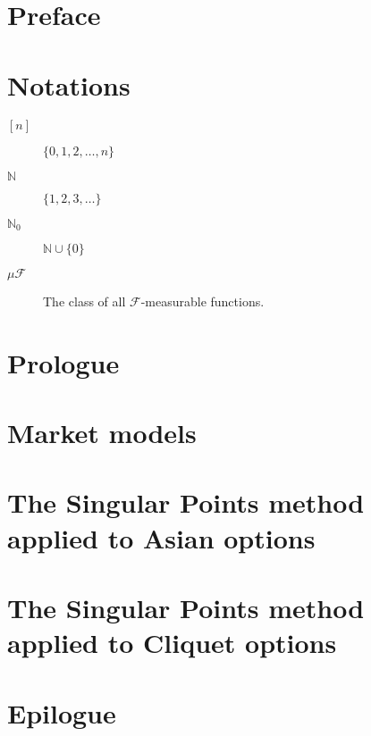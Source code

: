 \documentclass[12pt,a4paper,oneside]{amsbook}
\begin{document}
\frontmatter







\tableofcontents



\chapter*{Preface}
\label{cha:preface}



\chapter*{Notations}
\begin{description}
	\item[$ {[n]} $] $ \{0, 1, 2, \dots, n\} $
	\item[$ \mathbb{N} $] $ \{ 1, 2, 3, \dots \} $
	\item[$ \mathbb{N}_0 $] $ \mathbb{N} \cup \{ 0 \} $
	\item[$ \mu \mathcal{F} $] The class of all $ \mathcal{F} $-measurable functions.
\end{description}


\mainmatter

\chapter{Prologue}
\label{cha:prologue}


\chapter{Market models}
\label{cha:models}


\chapter[Asian options]{The Singular Points method applied to Asian options}
\label{cha:sp-asian}


\chapter[Cliquet options]{The Singular Points method applied to Cliquet options}
\label{cha:sp-cliquet}


\chapter{Epilogue}
\label{cha:epilogue}



\appendix


\backmatter

\printbibliography
\end{document}
